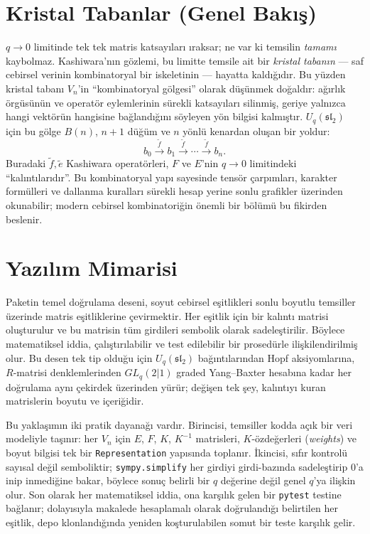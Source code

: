 \documentclass[10pt]{math}
\numberwithin{equation}{section}
\theoremstyle{plain}
\theoremstyle{definition}
\renewcommand{\sl}{\mathfrak{sl}}
\newcommand{\Uq}{U_q(\sl_2)}
\begin{document}
\section{Kristal Tabanlar (Genel Bakış)}

$q \to 0$ limitinde tek tek matris katsayıları ıraksar; ne var ki temsilin
\emph{tamamı} kaybolmaz. Kashiwara'nın gözlemi, bu limitte temsile ait bir
\emph{kristal tabanın} --- saf cebirsel verinin kombinatoryal bir iskeletinin ---
hayatta kaldığıdır. Bu yüzden kristal tabanı $V_n$'in ``kombinatoryal gölgesi''
olarak düşünmek doğaldır: ağırlık örgüsünün ve operatör eylemlerinin sürekli
katsayıları silinmiş, geriye yalnızca hangi vektörün hangisine bağlandığını
söyleyen yön bilgisi kalmıştır. $\Uq$ için bu gölge $B(n)$, $n+1$ düğüm ve $n$
yönlü kenardan oluşan bir yoldur:
\[
  b_0 \xrightarrow{\tilde{f}} b_1 \xrightarrow{\tilde{f}} \cdots
  \xrightarrow{\tilde{f}} b_n.
\]
Buradaki $\tilde{f}, \tilde{e}$ Kashiwara operatörleri, $F$ ve $E$'nin
$q \to 0$ limitindeki ``kalıntılarıdır''. Bu kombinatoryal yapı sayesinde tensör
çarpımları, karakter formülleri ve dallanma kuralları sürekli hesap yerine
sonlu grafikler üzerinden okunabilir; modern cebirsel kombinatoriğin önemli bir
bölümü bu fikirden beslenir.

\section{Yazılım Mimarisi}

Paketin temel doğrulama deseni, soyut cebirsel eşitlikleri sonlu boyutlu
temsiller üzerinde matris eşitliklerine çevirmektir. Her eşitlik için bir kalıntı
matrisi oluşturulur ve bu matrisin tüm girdileri sembolik olarak sadeleştirilir.
Böylece matematiksel iddia, çalıştırılabilir ve test edilebilir bir prosedürle
ilişkilendirilmiş olur. Bu desen tek tip olduğu için $\Uq$ bağıntılarından Hopf
aksiyomlarına, $R$-matrisi denklemlerinden $GL_q(2|1)$ graded Yang--Baxter
hesabına kadar her doğrulama aynı çekirdek üzerinden yürür; değişen tek şey,
kalıntıyı kuran matrislerin boyutu ve içeriğidir.

Bu yaklaşımın iki pratik dayanağı vardır. Birincisi, temsiller kodda açık bir
veri modeliyle taşınır: her $V_n$ için $E$, $F$, $K$, $K^{-1}$ matrisleri,
$K$-özdeğerleri (\emph{weights}) ve boyut bilgisi tek bir \texttt{Representation}
yapısında toplanır. İkincisi, sıfır kontrolü sayısal değil semboliktir;
\texttt{sympy.simplify} her girdiyi girdi-bazında sadeleştirip $0$'a inip
inmediğine bakar, böylece sonuç belirli bir $q$ değerine değil genel $q$'ya
ilişkin olur. Son olarak her matematiksel iddia, ona karşılık gelen bir
\texttt{pytest} testine bağlanır; dolayısıyla makalede hesaplamalı olarak
doğrulandığı belirtilen her eşitlik, depo klonlandığında yeniden koşturulabilen
somut bir teste karşılık gelir.
\end{document}
